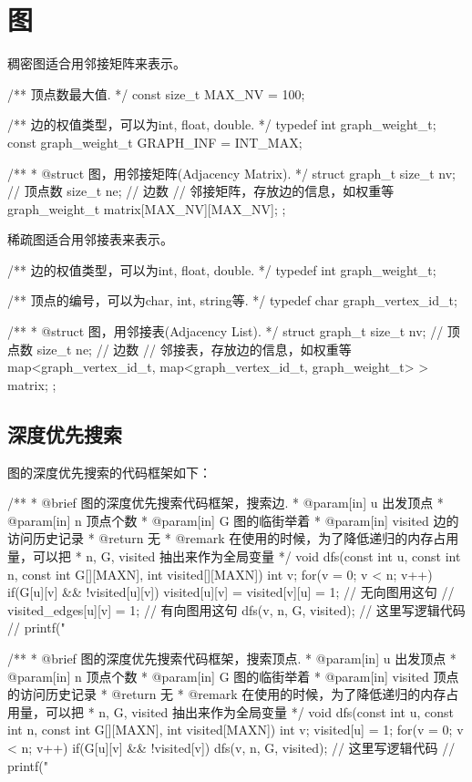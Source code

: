 \chapter{图}
稠密图适合用邻接矩阵来表示。
\begin{Codex}[label=am_graph.cpp]
/** 顶点数最大值. */
const size_t MAX_NV = 100;

/** 边的权值类型，可以为int, float, double. */
typedef int graph_weight_t;
const graph_weight_t GRAPH_INF = INT_MAX;

/**
 * @struct 图，用邻接矩阵(Adjacency Matrix).
 */
struct graph_t {
    size_t nv; // 顶点数
    size_t ne; // 边数
    // 邻接矩阵，存放边的信息，如权重等
    graph_weight_t matrix[MAX_NV][MAX_NV];
};
\end{Codex}

稀疏图适合用邻接表来表示。
\begin{Codex}[label=al_graph.cpp]
/** 边的权值类型，可以为int, float, double. */
typedef int graph_weight_t;

/** 顶点的编号，可以为char, int, string等. */
typedef char graph_vertex_id_t;

/**
 * @struct 图，用邻接表(Adjacency List).
 */
struct graph_t {
    size_t nv; // 顶点数
    size_t ne; // 边数
    // 邻接表，存放边的信息，如权重等
    map<graph_vertex_id_t, map<graph_vertex_id_t, graph_weight_t> > matrix;
};
\end{Codex}

\section{深度优先搜索} %
图的深度优先搜索的代码框架如下：

\begin{Codex}[label=graph.c]
/**
 * @brief 图的深度优先搜索代码框架，搜索边.
 * @param[in] u 出发顶点
 * @param[in] n 顶点个数
 * @param[in] G 图的临街举着
 * @param[in] visited 边的访问历史记录
 * @return 无
 * @remark 在使用的时候，为了降低递归的内存占用量，可以把
 * n, G, visited 抽出来作为全局变量
 */
void dfs(const int u, 
                const int n, const int G[][MAXN], int visited[][MAXN]) {
    int v;
    for(v = 0;  v < n; v++) if(G[u][v] && !visited[u][v]) {
        visited[u][v] = visited[v][u] = 1; // 无向图用这句
        // visited_edges[u][v] = 1; // 有向图用这句
        dfs(v, n, G, visited);
        // 这里写逻辑代码
        // printf("%
    }
}

/**
 * @brief 图的深度优先搜索代码框架，搜索顶点.
 * @param[in] u 出发顶点
 * @param[in] n 顶点个数
 * @param[in] G 图的临街举着
 * @param[in] visited 顶点的访问历史记录
 * @return 无
 * @remark 在使用的时候，为了降低递归的内存占用量，可以把
 * n, G, visited 抽出来作为全局变量
 */
void dfs(const int u, 
                const int n, const int G[][MAXN], int visited[MAXN]) {  
    int v;
    visited[u] = 1;
    for(v = 0;  v < n; v++) if(G[u][v] && !visited[v]) {
        dfs(v, n, G, visited);
        // 这里写逻辑代码
        // printf("%
    }
}
\end{Codex}

